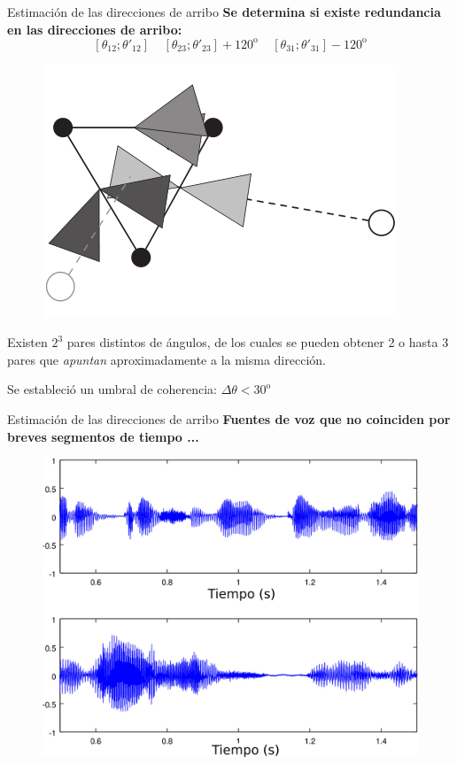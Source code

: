 \documentclass[12pt,aspectratio=169]{beamer}
\begin{document}
	\begin{frame}{Estimación de las direcciones de arribo}
		\textbf{Se determina si existe redundancia en las direcciones de arribo:}
		\begin{equation}
		\left[\theta_{12}; \theta'_{12}\right]~~~~~\left[\theta_{23}; \theta'_{23}\right]+120^{\mathrm{o}}~~~~~\left[\theta_{31}; \theta'_{31}\right]-120^{\mathrm{o}}
		\end{equation}		
		\hspace{5mm}
		\begin{minipage}{70mm}
			\begin{figure}[h]
				\centering
				\includegraphics[width=\linewidth]{figures/redundancia}
			\end{figure}
		\end{minipage}
	\hspace{5mm}
		\begin{minipage}{60mm}
			Existen $2^3$ pares distintos de ángulos, de los cuales se pueden obtener 2 o hasta 3 pares que \textit{apuntan} aproximadamente a la misma dirección.
			\vspace{5mm}	
		
			\pause
			
			Se estableció un umbral de coherencia: $\Delta \theta < 30^{\mathrm{o}}$
		\end{minipage}
	\end{frame}

	\begin{frame}{Estimación de las direcciones de arribo}
	\textbf{Fuentes de voz que no coinciden por breves segmentos de tiempo ...}
	\begin{figure}[h]
		\centering
		\includegraphics[width=0.5\linewidth]{figures/nonoverlap}
	\end{figure}
	\end{frame}
	
\end{document}

